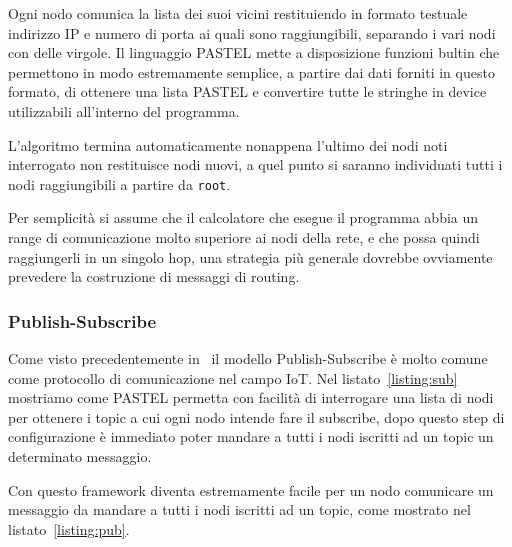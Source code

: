 \documentclass[10pt]{article}
\begin{document}
Ogni nodo comunica la lista dei suoi vicini restituiendo in formato testuale indirizzo IP e numero di porta ai quali sono raggiungibili, separando i vari nodi con delle virgole. Il linguaggio PASTEL mette a disposizione funzioni bultin che permettono in modo estremamente semplice, a partire dai dati forniti in questo formato, di ottenere una lista PASTEL e convertire tutte le stringhe in device utilizzabili all'interno del programma.

L'algoritmo termina automaticamente nonappena l'ultimo dei nodi noti interrogato non restituisce nodi nuovi, a quel punto si saranno individuati tutti i nodi raggiungibili a partire da \texttt{root}.

Per semplicità si assume che il calcolatore che esegue il programma abbia un range di comunicazione molto superiore ai nodi della rete, e che possa quindi raggiungerli in un singolo hop, una strategia più generale dovrebbe ovviamente prevedere la costruzione di messaggi di routing.



\subsubsection{Publish-Subscribe}\label{subsubsection:pub-sub}

Come visto precedentemente in~\cite{tandale2017empirical} il modello Publish-Subscribe è molto comune come protocollo di comunicazione nel campo IoT. Nel listato~\ref{listing:sub} mostriamo come PASTEL permetta con facilità di interrogare una lista di nodi per ottenere i topic a cui ogni nodo intende fare il subscribe, dopo questo step di configurazione è immediato poter mandare a tutti i nodi iscritti ad un topic un determinato messaggio.





Con questo framework diventa estremamente facile per un nodo comunicare un messaggio da mandare a tutti i nodi iscritti ad un topic, come mostrato nel listato~\ref{listing:pub}.
\end{document}
